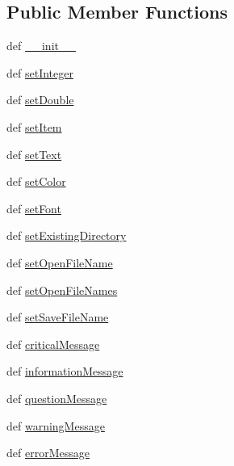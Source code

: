 \subsection*{Public Member Functions}
\begin{DoxyCompactItemize}
\item 
def \hyperlink{classstandarddialogs_1_1Dialog_ae537e0095088dfb36622e89cf1cee06e}{\+\_\+\+\_\+init\+\_\+\+\_\+}
\item 
def \hyperlink{classstandarddialogs_1_1Dialog_a717d5a19437dda53c4d61e8cc9ec2e56}{set\+Integer}
\item 
def \hyperlink{classstandarddialogs_1_1Dialog_a28b51428a5a9a23358481411ab8f1d49}{set\+Double}
\item 
def \hyperlink{classstandarddialogs_1_1Dialog_a083599846870ba134e8f72dee915c4a3}{set\+Item}
\item 
def \hyperlink{classstandarddialogs_1_1Dialog_a8d1ea236a184fb5333ca8dfa054219e1}{set\+Text}
\item 
def \hyperlink{classstandarddialogs_1_1Dialog_a9655e8120f01292a76fd5ed1da486eab}{set\+Color}
\item 
def \hyperlink{classstandarddialogs_1_1Dialog_ad6a5c4c90376b9e91f84963605c1ef1e}{set\+Font}
\item 
def \hyperlink{classstandarddialogs_1_1Dialog_a235749ae67199262f22cfb92da5fa2e5}{set\+Existing\+Directory}
\item 
def \hyperlink{classstandarddialogs_1_1Dialog_adee754a05c33f6a96e1682b3e3866e87}{set\+Open\+File\+Name}
\item 
def \hyperlink{classstandarddialogs_1_1Dialog_aada29a954ada25a17eeaca929313c8d5}{set\+Open\+File\+Names}
\item 
def \hyperlink{classstandarddialogs_1_1Dialog_ae10fb30fd574e8a59bef7ee501e8edfa}{set\+Save\+File\+Name}
\item 
def \hyperlink{classstandarddialogs_1_1Dialog_aa5f5ccdd355ab5df8d05851e6b72c53a}{critical\+Message}
\item 
def \hyperlink{classstandarddialogs_1_1Dialog_a610453702c8133aa4560b76a09ec98d2}{information\+Message}
\item 
def \hyperlink{classstandarddialogs_1_1Dialog_aab26a9a488995392292ab9669fa3c50a}{question\+Message}
\item 
def \hyperlink{classstandarddialogs_1_1Dialog_a269393aaeea9549aa6946fc210daf31f}{warning\+Message}
\item 
def \hyperlink{classstandarddialogs_1_1Dialog_a44ed3b64b2ec5fa963971c7db6a95015}{error\+Message}
\end{DoxyCompactItemize}
